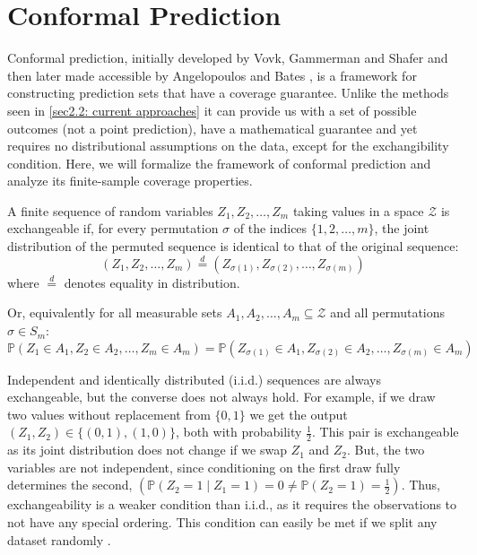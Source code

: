 \section{Conformal Prediction}
\label{sec2.3: conformal prediction}
Conformal prediction, initially developed by Vovk, Gammerman and Shafer \cite{vovk2005algorithmic} and then later 
made accessible by Angelopoulos and Bates \cite{angelopoulos2023conformal}, is a framework for constructing prediction 
sets that have a coverage guarantee. Unlike the methods seen in \ref{sec2.2: current approaches} it can provide us with a 
set of possible outcomes (not a point prediction), have a mathematical guarantee and yet requires no distributional 
assumptions on the data, except for the exchangibility condition. Here, we will formalize the framework of 
conformal prediction and analyze its finite-sample coverage properties.

\newpage
\begin{definition}[Exchangeability]
\label{def: exchangeability}
A finite sequence of random variables $Z_1, Z_2, \dots, Z_m$ taking values in a space $\mathcal{Z}$ is exchangeable if, 
for every permutation $\sigma$ of the indices $\{1, 2, \dots, m\}$, the joint distribution of the permuted sequence is 
identical to that of the original sequence:
$$(Z_1, Z_2, \dots, Z_m) \overset{d}{=} (Z_{\sigma(1)}, Z_{\sigma(2)}, \dots, Z_{\sigma(m)})$$
where $\overset{d}{=}$ denotes equality in distribution.

Or, equivalently for all measurable sets $A_1, A_2, \dots, A_m \subseteq \mathcal{Z}$ and all permutations 
$\sigma \in S_m$:
$$\mathbb{P}(Z_1 \in A_1, Z_2 \in A_2, \dots, Z_m \in A_m) = \mathbb{P}(Z_{\sigma(1)} \in A_1, Z_{\sigma(2)} \in A_2, 
\dots, Z_{\sigma(m)} \in A_m)$$ 
\end{definition}


Independent and identically distributed (i.i.d.) sequences are always exchangeable, but the converse does 
not always hold. For example, if we draw two values without replacement from $\{0,1\}$ we get the output $(Z_1, Z_2) \in 
\{(0,1), (1,0)\}$, both with probability $\frac{1}{2}$. This pair is exchangeable as its joint distribution 
does not change if we swap $Z_1$ and $Z_2$. But, the two variables are not independent, since conditioning on the 
first draw fully determines the second, $\left(\mathbb{P}(Z_2 = 1 \mid Z_1 = 1) = 0 \neq \mathbb{P}(Z_2 = 1) = \frac{1}{2}\right)$. 
Thus, exchangeability is a weaker condition than i.i.d., as it requires the observations to not have any special ordering. 
This condition can easily be met if we split any dataset randomly \cite{ochoarivera2024conformal, vovk2005algorithmic}.  


